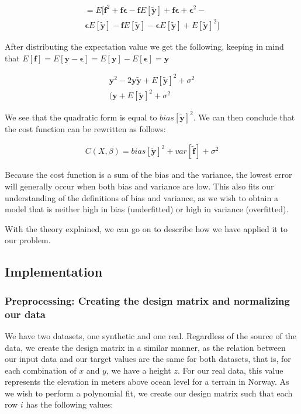 \documentclass[twocolumn,10pt,cleanfoot]{asme2ej}
\begin{document}
\begin{multline}
= E[\bm{f}^2 + \bm{f}\bm{\epsilon} - \bm{f}E[\bm{\tilde{y}}] + \bm{f\epsilon} + \bm{\epsilon}^2 - \\ 
	\bm{\epsilon}E[\bm{\tilde{y}}] - \bm{f}E[\bm{\tilde{y}}] - \bm{\epsilon}E[\bm{\tilde{y}}] + E[\bm{\tilde{y}}]^2]
\end{multline}

After distributing the expectation value we get the following, keeping in mind that $E[\bm{f}] = E[\bm{y} - \bm{\epsilon}] = E[\bm{y}] - E[\bm{\epsilon}] = \bm{y}$

\begin{gather}
\bm{y}^2 - 2\bm{y}\bm{\tilde{y}} + E[\bm{\tilde{y}}]^2 + \sigma^2 \\
(\bm{y} + E[\bm{\tilde{y}}]^2 + \sigma^2 
\end{gather}

We see that the quadratic form is equal to $bias[\bm{\tilde{y}}]^2$. We can then conclude that the cost function can be rewritten as follows:

\begin{gather}
C(X,\beta) = bias[\bm{\tilde{y}}]^2 + var[\bm{\tilde{f}}] + \sigma^2 
\end{gather}


Because the cost function is a sum of the bias and the variance, the lowest error will generally occur when both bias and variance are low. This also fits our understanding of the definitions of bias and variance, as we wish to obtain a model that is neither high in bias (underfitted) or high in variance (overfitted).


With the theory explained, we can go on to describe how we have applied it to our problem.




\subsection{Implementation}
\subsubsection{Preprocessing: Creating the design matrix and normalizing our data}
We have two datasets, one synthetic and one real. Regardless of the source of the data, we create the design matrix in a similar manner, as the relation between our input data and our target values are the same for both datasets, that is, for each combination of $x$ and $y$, we have a height $z$. For our real data, this value represents the elevation in meters above ocean level for a terrain in Norway. As we wish to perform a polynomial fit, we create our design matrix such that each row $i$ has the following values:
\end{document}

